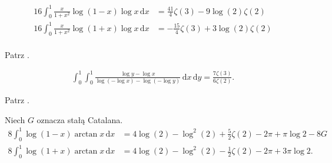 
\begin{problem_with_solution}
    \label{valean_1_14}%
    \begin{align}
        16 \int_0^1 \frac{x}{1+ x^2} \log (1 - x) \log x \,\mathrm{d}x & = \frac{41}{4} \zeta(3) - 9 \log(2) \zeta(2) \\
        16 \int_0^1 \frac{x}{1+ x^2} \log (1 + x) \log x \,\mathrm{d}x & = -\frac{15}{4} \zeta(3) + 3 \log(2) \zeta(2) \\
    \end{align} 
\end{problem_with_solution}


\begin{solution}
    Patrz \cite[s. 8]{valean19}.
\end{solution}

\begin{problem_with_solution}
    \label{valean_1_17}%
    \begin{align}
        \int_0^1 \int_0^1 \frac{\log y - \log x}{\log (- \log x) - \log(- \log y)} \,\mathrm{d}x \,\mathrm{d}y = \frac{7 \zeta(3)}{6 \zeta (2)}.
    \end{align} 
\end{problem_with_solution}


\begin{solution}
    Patrz \cite[s. 10]{valean19}.
\end{solution}

\begin{problem_with_solution}
    \label{valean_1_18}%
    Niech $G$ oznacza stałą Catalana.
    \begin{align}
        8 \int_0^1 \log (1 - x) \arctan x \,\mathrm{d}x & = 4 \log (2) - \log^2 (2) + \frac 5 2 \zeta(2) - 2 \pi + \pi \log 2 - 8 G \\
        8 \int_0^1 \log (1 + x) \arctan x \,\mathrm{d}x & = 4 \log (2) - \log^2 (2) - \frac 1 2 \zeta(2) - 2 \pi + 3 \pi \log 2.
    \end{align} 
\end{problem_with_solution}

